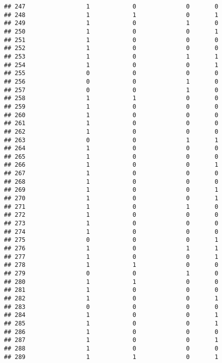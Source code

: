 \documentclass[]{article}
\begin{document}
\begin{verbatim}
## 247                 1            0              0       0
## 248                 1            1              0       1
## 249                 1            0              1       0
## 250                 1            0              0       1
## 251                 1            0              0       0
## 252                 1            0              0       0
## 253                 1            0              1       1
## 254                 1            0              0       1
## 255                 0            0              0       0
## 256                 0            0              1       0
## 257                 0            0              1       0
## 258                 1            1              0       0
## 259                 1            0              0       0
## 260                 1            0              0       0
## 261                 1            0              0       0
## 262                 1            0              0       0
## 263                 0            0              1       1
## 264                 1            0              0       0
## 265                 1            0              0       0
## 266                 1            0              0       1
## 267                 1            0              0       0
## 268                 1            0              0       0
## 269                 1            0              0       1
## 270                 1            0              0       1
## 271                 1            0              1       0
## 272                 1            0              0       0
## 273                 1            0              0       0
## 274                 1            0              0       0
## 275                 0            0              0       1
## 276                 1            0              1       1
## 277                 1            0              0       1
## 278                 1            1              0       0
## 279                 0            0              1       0
## 280                 1            1              0       0
## 281                 1            0              0       0
## 282                 1            0              0       1
## 283                 0            0              0       0
## 284                 1            0              0       1
## 285                 1            0              0       1
## 286                 1            0              0       0
## 287                 1            0              0       1
## 288                 1            0              0       0
## 289                 1            1              0       1

\end{verbatim}
\end{document}
